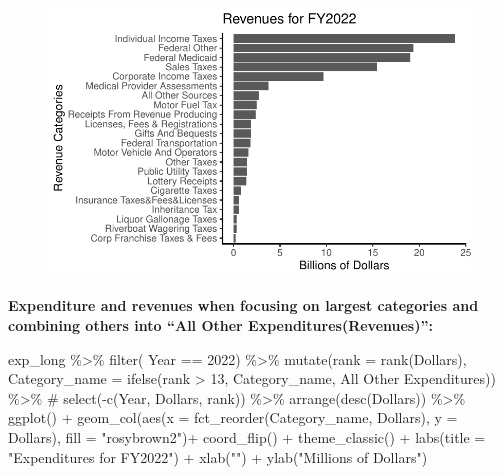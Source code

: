 \documentclass[
  letterpaper,
  DIV=11,
  numbers=noendperiod]{scrreport}
\newenvironment{Shaded}{\begin{snugshade}}{\end{snugshade}}
\newcommand{\AttributeTok}[1]{\textcolor[rgb]{0.40,0.45,0.13}{#1}}
\newcommand{\CommentTok}[1]{\textcolor[rgb]{0.37,0.37,0.37}{#1}}
\newcommand{\DecValTok}[1]{\textcolor[rgb]{0.68,0.00,0.00}{#1}}
\newcommand{\FunctionTok}[1]{\textcolor[rgb]{0.28,0.35,0.67}{#1}}
\newcommand{\NormalTok}[1]{\textcolor[rgb]{0.00,0.23,0.31}{#1}}
\newcommand{\SpecialCharTok}[1]{\textcolor[rgb]{0.37,0.37,0.37}{#1}}
\newcommand{\StringTok}[1]{\textcolor[rgb]{0.13,0.47,0.30}{#1}}
\begin{document}
\begin{figure}[H]

{\centering \includegraphics{./Everything_files/figure-pdf/unnamed-chunk-8-2.pdf}

}

\end{figure}

\textbf{Expenditure and revenues when focusing on largest categories and
combining others into ``All Other Expenditures(Revenues)'':}

\begin{Shaded}
\begin{Highlighting}[]
\NormalTok{exp\_long }\SpecialCharTok{\%\textgreater{}\%}
  \FunctionTok{filter}\NormalTok{( Year }\SpecialCharTok{==} \DecValTok{2022}\NormalTok{) }\SpecialCharTok{\%\textgreater{}\%}
  \FunctionTok{mutate}\NormalTok{(}\AttributeTok{rank =} \FunctionTok{rank}\NormalTok{(Dollars),}
        \AttributeTok{Category\_name =} \FunctionTok{ifelse}\NormalTok{(rank }\SpecialCharTok{\textgreater{}} \DecValTok{13}\NormalTok{, Category\_name, }\StringTok{\textquotesingle{}All Other Expenditures\textquotesingle{}}\NormalTok{)) }\SpecialCharTok{\%\textgreater{}\%}
 \CommentTok{\# select({-}c(Year, Dollars, rank)) \%\textgreater{}\%}
  \FunctionTok{arrange}\NormalTok{(}\FunctionTok{desc}\NormalTok{(Dollars)) }\SpecialCharTok{\%\textgreater{}\%}
  \FunctionTok{ggplot}\NormalTok{() }\SpecialCharTok{+} 
  \FunctionTok{geom\_col}\NormalTok{(}\FunctionTok{aes}\NormalTok{(}\AttributeTok{x =} \FunctionTok{fct\_reorder}\NormalTok{(Category\_name, }\StringTok{\textasciigrave{}}\AttributeTok{Dollars}\StringTok{\textasciigrave{}}\NormalTok{), }\AttributeTok{y =} \StringTok{\textasciigrave{}}\AttributeTok{Dollars}\StringTok{\textasciigrave{}}\NormalTok{), }\AttributeTok{fill =} \StringTok{"rosybrown2"}\NormalTok{)}\SpecialCharTok{+} 
  \FunctionTok{coord\_flip}\NormalTok{() }\SpecialCharTok{+}
      \FunctionTok{theme\_classic}\NormalTok{() }\SpecialCharTok{+}
    \FunctionTok{labs}\NormalTok{(}\AttributeTok{title =} \StringTok{"Expenditures for FY2022"}\NormalTok{) }\SpecialCharTok{+}
    \FunctionTok{xlab}\NormalTok{(}\StringTok{""}\NormalTok{) }\SpecialCharTok{+}
  \FunctionTok{ylab}\NormalTok{(}\StringTok{"Millions of Dollars"}\NormalTok{)}
\end{Highlighting}
\end{Shaded}
\end{document}
